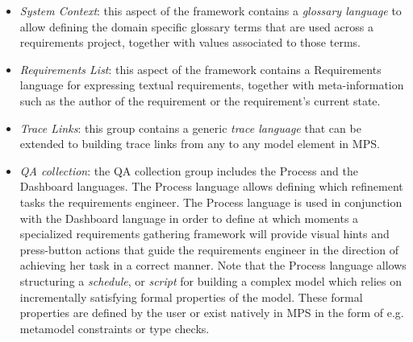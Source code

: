 \begin{itemize}
  \item \emph{System Context}: this aspect of the framework contains a
  \emph{glossary language} to allow defining the domain specific glossary terms that are used across a
  requirements project, together with values associated to those
  terms.
  \item \emph{Requirements List}: this aspect of the framework contains a
  \textsf{Requirements} language for expressing textual requirements, together with meta-information
  such as the author of the requirement or the requirement's current state.
  \item \emph{Trace Links}: this group contains a generic \emph{trace
  language} that can be extended to building trace links from any to any model
  element in MPS.
  \item \emph{QA collection}: the QA collection group includes the
  \textsf{Process} and the \textsf{Dashboard} languages. The \textsf{Process}
  language allows defining which refinement tasks the requirements engineer.
  The \textsf{Process} language is used in conjunction with the
  \textsf{Dashboard} language in order to define at which moments a specialized requirements
  gathering framework will provide visual hints and press-button actions that
  guide the requirements engineer in the direction of achieving her task in a
  correct manner. Note that the \textsf{Process} language allows structuring a
  \emph{schedule}, or \emph{script} for building a complex model which relies on
  incrementally satisfying formal properties of the model. These formal
  properties are defined by the user or exist natively in MPS in the form of
  e.g. metamodel constraints or type checks.
\end{itemize}
\vspace{-.5cm}


